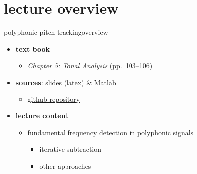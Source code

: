 

\subtitle{Part 6.4: Polyphonic fundamental frequency detection}


	

    \section[overview]{lecture overview}
        \begin{frame}{polyphonic pitch tracking}{overview}
            \begin{itemize}
                \item   \textbf{text book}  
                    \begin{itemize}
                        \item   \href{http://ieeexplore.ieee.org/xpl/articleDetails.jsp?tp=&arnumber=6331122&}{\underline{\textit{Chapter 5: Tonal Analysis} (pp.~103--106)}}
                    \end{itemize}
                \item   \textbf{sources}: slides (latex) \& Matlab  
                    \begin{itemize}
                        \item   \href{https://github.com/alexanderlerch/ACA-Slides}{\underline{github repository}}
                    \end{itemize}
                \bigskip
                \item<2->   \textbf{lecture content}
                    \begin{itemize}
                        \item<2->   fundamental frequency detection in polyphonic signals
                            \begin{itemize}
                                \item   iterative subtraction
                                \item   other approaches
                            \end{itemize}
                    \end{itemize}
            \end{itemize}
        \end{frame}

